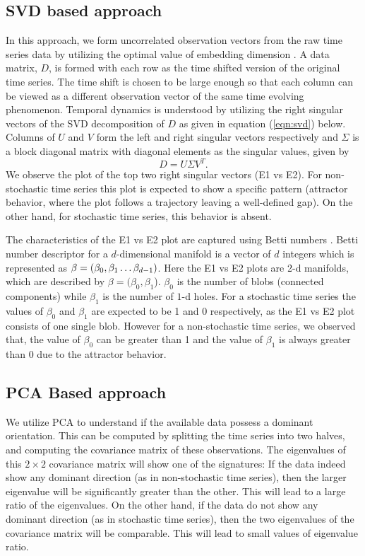 \documentclass[10pt,conference]{IEEEtran}
\begin{document}
\subsection{SVD based approach}
In this approach, we form uncorrelated observation vectors from the raw time series data by utilizing the optimal value of embedding dimension \cite{misra2006}. A data matrix, $D$, is formed with each row  as the  time shifted version of the original time series. The time shift is chosen to be large enough so that each column can be viewed as a different observation vector of the same time evolving phenomenon. Temporal dynamics is understood by utilizing the right singular vectors of the SVD decomposition of $D$ as given in equation (\ref{eqn:svd}) below. Columns of $U$ and $V$  form the left and right singular vectors respectively and $\Sigma$ is a block diagonal matrix with diagonal elements as the singular values, given by
\begin{equation}
D = U \Sigma V^T.
\label{eqn:svd}
\end{equation}
 We observe the plot of the top two right singular vectors (E1 vs E2). For non-stochastic time series this plot is expected to show a specific pattern (attractor behavior, where the plot follows a trajectory leaving a well-defined gap). On the other hand, for stochastic time series, this behavior is absent.

The characteristics of the E1 vs E2 plot are captured using Betti numbers \cite{jmlr}. Betti number descriptor for a $d$-dimensional manifold is a vector of $d$ integers which is represented as $\beta = (\beta_0, \beta_1 \mathellipsis \beta_{d-1})$. Here the E1 vs E2 plots are 2-d manifolds, which are described by  $\beta=(\beta_{0}, \beta_{1}$).  $\beta_{0}$ is the number of blobs (connected components) while $\beta_1$ is the number of $1$-d holes. For a stochastic time series the values of $\beta_{0}$  and $\beta_1$ are expected to be 1 and 0 respectively, as the E1 vs E2 plot consists of one single blob. However for a non-stochastic time series, we observed that, the value of $\beta_{0}$ can be greater than 1 and the value of $\beta_1$ is always greater than 0 due to the attractor behavior.


\subsection{PCA Based approach}
We utilize PCA to understand if the available data possess a dominant orientation. This can be computed by splitting the time series into two halves, and computing the covariance matrix of these observations. The eigenvalues of this $2 \times 2$ covariance matrix will show one of the signatures: If the data indeed show any dominant direction (as in non-stochastic time series), then the larger eigenvalue will be significantly greater than the other. This will lead to a large ratio of the eigenvalues. On the other hand, if the data do not show any dominant direction (as in stochastic time series), then the two eigenvalues of the covariance matrix will be comparable. This will lead to small values of eigenvalue ratio.
\end{document}
